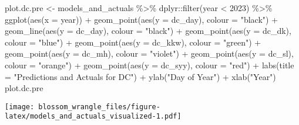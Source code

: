 \documentclass[
]{article}
\newenvironment{Shaded}{\begin{snugshade}}{\end{snugshade}}
\newcommand{\AttributeTok}[1]{\textcolor[rgb]{0.77,0.63,0.00}{#1}}
\newcommand{\DecValTok}[1]{\textcolor[rgb]{0.00,0.00,0.81}{#1}}
\newcommand{\FunctionTok}[1]{\textcolor[rgb]{0.00,0.00,0.00}{#1}}
\newcommand{\NormalTok}[1]{#1}
\newcommand{\OtherTok}[1]{\textcolor[rgb]{0.56,0.35,0.01}{#1}}
\newcommand{\SpecialCharTok}[1]{\textcolor[rgb]{0.00,0.00,0.00}{#1}}
\newcommand{\StringTok}[1]{\textcolor[rgb]{0.31,0.60,0.02}{#1}}
\begin{document}
\begin{Shaded}
\begin{Highlighting}[]
\NormalTok{plot.dc.pre }\OtherTok{\textless{}{-}}\NormalTok{ models\_and\_actuals }\SpecialCharTok{\%\textgreater{}\%}\NormalTok{ dplyr}\SpecialCharTok{::}\FunctionTok{filter}\NormalTok{(year }\SpecialCharTok{\textless{}} \DecValTok{2023}\NormalTok{) }\SpecialCharTok{\%\textgreater{}\%} 
  \FunctionTok{ggplot}\NormalTok{(}\FunctionTok{aes}\NormalTok{(}\AttributeTok{x =}\NormalTok{ year)) }\SpecialCharTok{+}
  \FunctionTok{geom\_point}\NormalTok{(}\FunctionTok{aes}\NormalTok{(}\AttributeTok{y =}\NormalTok{ dc\_day), }\AttributeTok{colour =} \StringTok{"black"}\NormalTok{) }\SpecialCharTok{+}
  \FunctionTok{geom\_line}\NormalTok{(}\FunctionTok{aes}\NormalTok{(}\AttributeTok{y =}\NormalTok{ dc\_day), }\AttributeTok{colour =} \StringTok{"black"}\NormalTok{) }\SpecialCharTok{+}
  \FunctionTok{geom\_point}\NormalTok{(}\FunctionTok{aes}\NormalTok{(}\AttributeTok{y =}\NormalTok{ dc\_dk), }\AttributeTok{colour =} \StringTok{"blue"}\NormalTok{) }\SpecialCharTok{+}
  \FunctionTok{geom\_point}\NormalTok{(}\FunctionTok{aes}\NormalTok{(}\AttributeTok{y =}\NormalTok{ dc\_kkw), }\AttributeTok{colour =} \StringTok{"green"}\NormalTok{) }\SpecialCharTok{+}
  \FunctionTok{geom\_point}\NormalTok{(}\FunctionTok{aes}\NormalTok{(}\AttributeTok{y =}\NormalTok{ dc\_mh), }\AttributeTok{colour =} \StringTok{"violet"}\NormalTok{) }\SpecialCharTok{+}
  \FunctionTok{geom\_point}\NormalTok{(}\FunctionTok{aes}\NormalTok{(}\AttributeTok{y =}\NormalTok{ dc\_sl), }\AttributeTok{colour =} \StringTok{"orange"}\NormalTok{) }\SpecialCharTok{+}
  \FunctionTok{geom\_point}\NormalTok{(}\FunctionTok{aes}\NormalTok{(}\AttributeTok{y =}\NormalTok{ dc\_syy), }\AttributeTok{colour =} \StringTok{"red"}\NormalTok{) }\SpecialCharTok{+}
  \FunctionTok{labs}\NormalTok{(}\AttributeTok{title =} \StringTok{"Predictions and Actuals for DC"}\NormalTok{) }\SpecialCharTok{+}
  \FunctionTok{ylab}\NormalTok{(}\StringTok{"Day of Year"}\NormalTok{) }\SpecialCharTok{+}
  \FunctionTok{xlab}\NormalTok{(}\StringTok{"Year"}\NormalTok{)}
\NormalTok{plot.dc.pre}
\end{Highlighting}
\end{Shaded}

\texttt{[image: blossom\_wrangle\_files/figure-latex/models\_and\_actuals\_visualized-1.pdf]}
\end{document}
